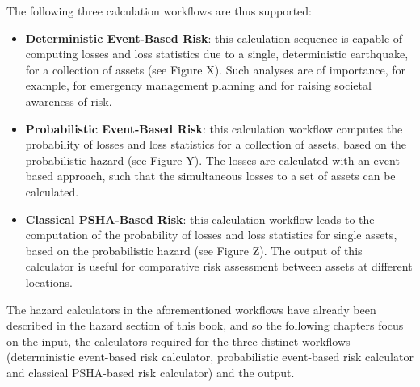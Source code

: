 The following three calculation workflows are thus supported:
\begin{itemize}
\item \textbf{Deterministic Event-Based Risk}: this calculation sequence is capable of computing losses and loss statistics due to a single,
deterministic earthquake, for a collection of assets (see Figure X). Such analyses are of importance, for example, for emergency management planning and for raising societal awareness of risk. 
\item \textbf{Probabilistic Event-Based Risk}: this calculation workflow computes the probability of losses and loss statistics for a collection of
assets, based on the probabilistic hazard (see Figure Y). The losses are calculated with an event-based approach,
such that the simultaneous losses to a set of assets can be calculated.
\item \textbf{Classical PSHA-Based Risk}: this calculation workflow leads to the computation of the probability of losses and loss statistics for
single assets, based on the probabilistic hazard (see Figure Z). The output of this calculator is useful for comparative risk assessment between assets at different locations.
\end{itemize}




The hazard calculators in the aforementioned workflows have already been described in the hazard section of this book, and so the following chapters focus on the input, the calculators required for the three distinct workflows (deterministic event-based risk calculator, probabilistic event-based risk calculator and classical PSHA-based risk calculator) and the output.
%